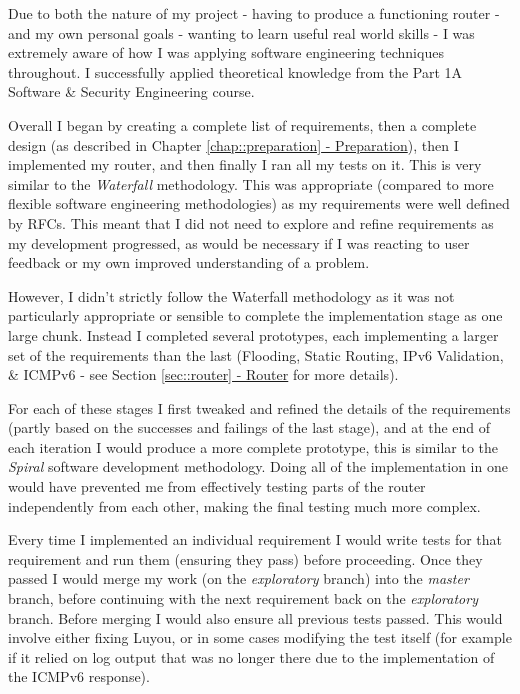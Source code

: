 \documentclass[12pt,a4paper,twoside,openany]{report}
\begin{document}
Due to both the nature of my project - having to produce a functioning router - and my own personal goals - wanting to learn useful real world skills - I was extremely aware of how I was applying software engineering techniques throughout.  I successfully applied theoretical knowledge from the Part 1A Software \& Security Engineering course.

\bigskip

Overall I began by creating a complete list of requirements, then a complete design (as described in Chapter \ref{chap::preparation}\hyperref[chap::preparation]{ - Preparation}), then I implemented my router, and then finally I ran all my tests on it.  This is very similar to the \textit{Waterfall} methodology.  This was appropriate (compared to more flexible software engineering methodologies) as my requirements were well defined by RFCs. This meant that I did not need to explore and refine requirements as my development progressed, as would be necessary if I was reacting to user feedback or my own improved understanding of a problem.

\bigskip

However, I didn't strictly follow the Waterfall methodology as it was not particularly appropriate or sensible to complete the implementation stage as one large chunk.  Instead I completed several prototypes, each implementing a larger set of the requirements than the last (Flooding, Static Routing, IPv6 Validation, \& ICMPv6 - see Section \ref{sec::router}\hyperref[sec::router]{ - Router} for more details). 

For each of these stages I first tweaked and refined the details of the requirements (partly based on the successes and failings of the last stage), and at the end of each iteration I would produce a more complete prototype, this is similar to the \textit{Spiral} software development methodology. Doing all of the implementation in one would have prevented me from effectively testing parts of the router independently from each other, making the final testing much more complex.

\bigskip

Every time I implemented an individual requirement I would write tests for that requirement and run them (ensuring they pass) before proceeding.  Once they passed I would merge my work (on the \textit{exploratory} branch) into the \textit{master} branch, before continuing with the next requirement back on the \textit{exploratory} branch.  Before merging I would also ensure all previous tests passed.  This would involve either fixing Luyou, or in some cases modifying the test itself (for example if it relied on log output that was no longer there due to the implementation of the ICMPv6 response).  
\end{document}
